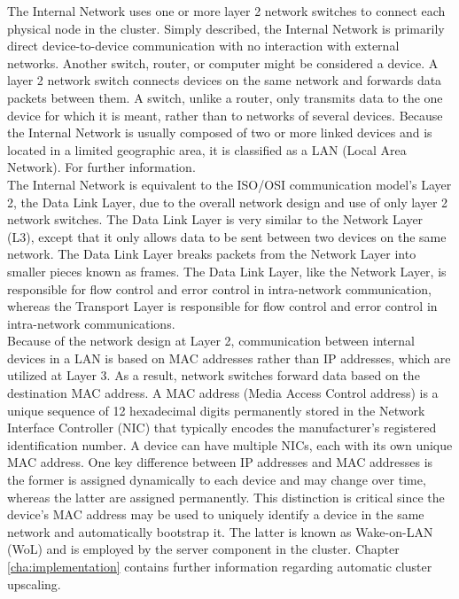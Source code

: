 The Internal Network uses one or more layer 2 network switches to connect each physical
node in the cluster. Simply described, the Internal Network is primarily direct device-to-device
communication with no interaction with external networks. Another switch, router,
or computer might be considered a device. A layer 2 network switch connects devices
on the same network and forwards data packets between them. A switch, unlike a router,
only transmits data to the one device for which it is meant, rather than to networks
of several devices\cite{switch}. Because the Internal Network is usually composed
of two or more linked devices and is located in a limited geographic area, it is
classified as a LAN (Local Area Network). For further information\cite{lan}. \\ %
The Internal Network is equivalent to the ISO/OSI communication model's Layer 2,
the Data Link Layer, due to the overall network design and use of only layer 2
network switches. The Data Link Layer is very similar to the Network Layer (L3),
except that it only allows data to be sent between two devices on the same
network. The Data Link Layer breaks packets from the Network Layer into smaller pieces
known as frames. The Data Link Layer, like the Network Layer, is responsible for
flow control and error control in intra-network communication, whereas the Transport
Layer is responsible for flow control and error control in intra-network communications\cite{osi}.
\\ %
Because of the network design at Layer 2, communication between internal devices
in a LAN is based on MAC addresses rather than IP addresses, which are utilized
at Layer 3. As a result, network switches forward data based on the destination MAC
address. A MAC address (Media Access Control address) is a unique sequence of 12
hexadecimal digits permanently stored in the Network Interface Controller (NIC)
that typically encodes the manufacturer's registered identification number. A device
can have multiple NICs, each with its own unique MAC address\cite{mac_address}.
One key difference between IP addresses and MAC addresses is the former is
assigned dynamically to each device and may change over time, whereas the latter
are assigned permanently. This distinction is critical since the device's MAC
address may be used to uniquely identify a device in the same network and
automatically bootstrap it. The latter is known as Wake-on-LAN (WoL) and is employed
by the server component in the cluster. Chapter \ref{cha:implementation}
contains further information regarding automatic cluster upscaling. \\ %

